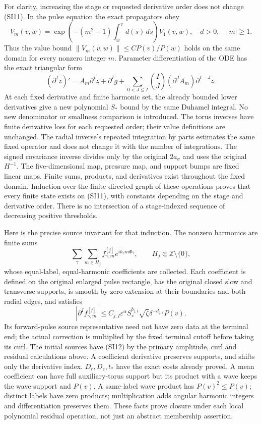 \documentclass[10pt,a4paper]{article}
\begin{document}
For clarity, increasing the stage or requested derivative order does not
change (SI11).  In the pulse equation the exact propagators obey
\[
V_m(v,w)=\exp\left(-(m^2-1)\int_w^v d(s)\,ds\right)V_1(v,w),
\quad d>0,\quad |m|\ge1.
\]
Thus the value bound $\|V_m(v,w)\|\le C P(v)/P(w)$ holds on the
same domain for every nonzero integer $m$.  Parameter differentiation of
the ODE has the exact triangular form
\[
(\partial^I z)'=A_m\partial^Iz+\partial^Ig+
\sum_{0<J\le I}\binom IJ(\partial^JA_m)\partial^{I-J}z.
\]
At each fixed derivative and finite harmonic set, the already bounded
lower derivatives give a new polynomial $S_*$ bound by the same
Duhamel integral.  No new denominator or smallness comparison is introduced.
The torus inverses have finite derivative loss for each requested order;
their value definitions are unchanged.  The radial inverse's repeated
integration by parts estimates the same fixed operator and does not change
it with the number of integrations.  The signed covariance inverse divides
only by the original $2a_\sigma$ and uses the original $H^{-1}$.
The five-dimensional map, pressure map, and support bumps are fixed linear
maps.  Finite sums, products, and derivatives exist throughout the fixed
domain.  Induction over the finite directed graph of these operations proves
that every finite state exists on (SI11), with constants depending on the
stage and derivative order.  There is no intersection of a stage-indexed
sequence of decreasing positive thresholds.

Here is the precise source invariant for that induction.  The nonzero
harmonics are finite sums
\[
\sum_{\gamma}\sum_{m\in H_j}
 f^{[j]}_{\gamma,m}e^{ik_\gamma m\Phi_\gamma},\qquad
H_j\Subset\mathbb Z\setminus\{0\},
\]
whose equal-label, equal-harmonic coefficients are collected.  Each
coefficient is defined on the original enlarged pulse rectangle, has the
original closed slow and transverse supports, is smooth by zero extension
at their boundaries and both radial edges, and satisfies
\[
|\partial^If^{[j]}_{\gamma,m}|
\le C_{j,I}\varepsilon^\alpha S_*^{b_{j,I}}
 \sqrt\zeta\delta^{-d_{j,I}}P(v).
\tag{SI12}
\]
Its forward-pulse source representative need not have zero data at the
terminal end; the actual correction is multiplied by the fixed terminal
cutoff before taking its curl.  The initial sources have (SI12) by the
primary amplitude, curl and residual calculations above.  A coefficient
derivative preserves supports, and shifts only the derivative index.
$D_r,D_z,t_*$ have the exact costs already proved.  A mean coefficient
can have full auxiliary-torus support but its product with a wave keeps
the wave support and $P(v)$.  A same-label wave product has $P(v)^2\le P(v)$;
distinct labels have zero products; multiplication adds angular harmonic
integers and differentiation preserves them.  These facts prove closure
under each local polynomial residual operation, not just an abstract
membership assertion.
\end{document}
